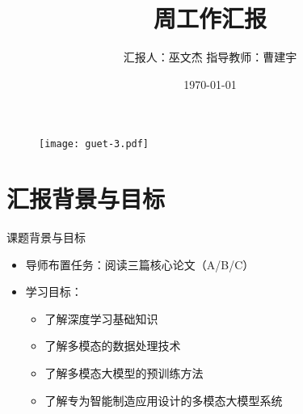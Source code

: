 \documentclass[aspectratio=169,AutoFakeBold]{beamer}
\author{汇报人：巫文杰 \texorpdfstring{\quad}{} 指导教师：曹建宇}
\title{周工作汇报}
\institute{计算机与信息安全学院}
\date{\today}
\begin{document}
\kaishu
\begin{frame}
    \titlepage
    \begin{figure}[htpb]
        \begin{center}
            \texttt{[image: guet-3.pdf]}
        \end{center}
    \end{figure}
\end{frame}

\begin{frame}
    \tableofcontents[sectionstyle=show,subsectionstyle=show/shaded/hide,subsubsectionstyle=show/shaded/hide]    
\end{frame}

\section{汇报背景与目标}
\begin{frame}{课题背景与目标}
    \begin{itemize}[<+-| alert@+>]
        \item 导师布置任务：阅读三篇核心论文（A/B/C）
        \item 学习目标：
            \begin{itemize}
                \item 了解深度学习基础知识
                \item 了解多模态的数据处理技术
                \item 了解多模态大模型的预训练方法
                \item 了解专为智能制造应用设计的多模态大模型系统
            \end{itemize}
    \end{itemize}
\end{frame}
\end{document}
